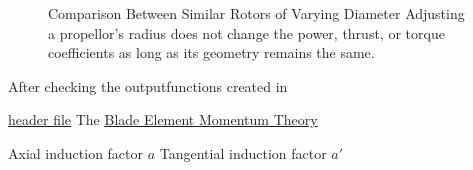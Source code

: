 \documentclass{article}
\begin{document}
\begin{figure}
  \label{fig:4}
  \centering
  \caption{Comparison Between Similar Rotors of Varying Diameter \newline Adjusting a propellor's radius does not change the power, thrust, or torque coefficients as long as its geometry remains the same.}
\end{figure}

After checking the outputfunctions created in 

\href{https://github.com/JoeSpencer1/497R-Projects/blob/Airfoil-Analysis/Airfoil_Functions.jl}{header file}
The \hyperlink{BEM}{Blade Element Momentum Theory}

Axial induction factor $a$ Tangential induction factor $a'$

\clearpage
\end{document}
